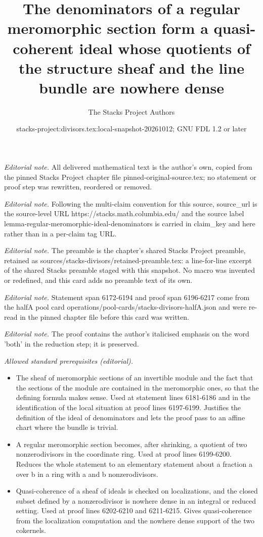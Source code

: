 \documentclass[10pt,a4paper]{amsart}
\title{The denominators of a regular meromorphic section form a quasi-coherent ideal whose quotients of the structure sheaf and the line bundle are nowhere dense}
\author{The Stacks Project Authors}
\date{stacks-project:divisors.tex:local-snapshot-20261012; GNU FDL 1.2 or later}
\theoremstyle{plain}
\theoremstyle{definition}
\theoremstyle{remark}
\numberwithin{equation}{subsection}
\begin{document}
\maketitle
\noindent\textit{Editorial note.} All delivered mathematical text is the author's own, copied from the pinned Stacks Project chapter file pinned-original-source.tex; no statement or proof step was rewritten, reordered or removed.\par\medskip
\noindent\textit{Editorial note.} Following the multi-claim convention for this source, source\_url is the source-level URL https://stacks.math.columbia.edu/ and the source label lemma-regular-meromorphic-ideal-denominators is carried in claim\_key and here rather than in a per-claim tag URL.\par\medskip
\noindent\textit{Editorial note.} The preamble is the chapter's shared Stacks Project preamble, retained as sources/stacks-divisors/retained-preamble.tex: a line-for-line excerpt of the shared Stacks preamble staged with this snapshot. No macro was invented or redefined, and this card adds no preamble text of its own.\par\medskip
\noindent\textit{Editorial note.} Statement span 6172-6194 and proof span 6196-6217 come from the halfA pool card operations/pool-cards/stacks-divisors-halfA.json and were re-read in the pinned chapter file before this card was written.\par\medskip
\noindent\textit{Editorial note.} The proof contains the author's italicised emphasis on the word 'both' in the reduction step; it is preserved.\par\medskip
\noindent\textit{Allowed standard prerequisites (editorial).}\begin{itemize}
\item The sheaf of meromorphic sections of an invertible module and the fact that the sections of the module are contained in the meromorphic ones, so that the defining formula makes sense. Used at statement lines 6181-6186 and in the identification of the local situation at proof lines 6197-6199. Justifies the definition of the ideal of denominators and lets the proof pass to an affine chart where the bundle is trivial.
\item A regular meromorphic section becomes, after shrinking, a quotient of two nonzerodivisors in the coordinate ring. Used at proof lines 6199-6200. Reduces the whole statement to an elementary statement about a fraction a over b in a ring with a and b nonzerodivisors.
\item Quasi-coherence of a sheaf of ideals is checked on localizations, and the closed subset defined by a nonzerodivisor is nowhere dense in an integral or reduced setting. Used at proof lines 6202-6210 and 6211-6215. Gives quasi-coherence from the localization computation and the nowhere dense support of the two cokernels.
\end{itemize}\medskip
\end{document}
